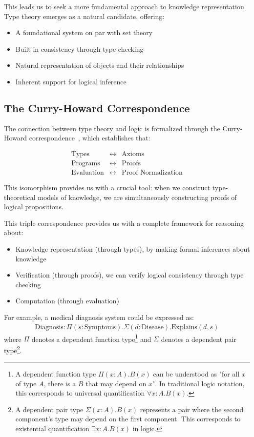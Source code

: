 \documentclass[11pt]{article}
\begin{document}
This leads us to seek a more fundamental approach to knowledge representation. Type theory emerges as a natural candidate, offering:

\begin{itemize}
    \item A foundational system on par with set theory
    \item Built-in consistency through type checking
    \item Natural representation of objects and their relationships
    \item Inherent support for logical inference
\end{itemize}

\subsection{The Curry-Howard Correspondence}
The connection between type theory and logic is formalized through the Curry-Howard correspondence~\cite{mimram2020program}, which establishes that:

\[
\begin{array}{lcl}
\text{Types} & \leftrightarrow & \text{Axioms} \\
\text{Programs} & \leftrightarrow & \text{Proofs} \\
\text{Evaluation} & \leftrightarrow & \text{Proof Normalization}
\end{array}
\]

This isomorphism provides us with a crucial tool: when we construct type-theoretical models of knowledge, we are simultaneously constructing proofs of logical propositions.

This triple correspondence provides us with a complete framework for reasoning about:
\begin{itemize}
    \item Knowledge representation (through types), by making formal inferences about knowledge
    \item Verification (through proofs), we can verify logical consistency through type checking
    \item Computation (through evaluation)
\end{itemize}

For example, a medical diagnosis system could be expressed as:
\[
\begin{array}{l}
\text{Diagnosis} : \Pi(s : \text{Symptoms}).\Sigma(d : \text{Disease}).\text{Explains}(d, s)
\end{array}
\]
where $\Pi$ denotes a dependent function type\footnote{A dependent function type $\Pi(x:A).B(x)$ can be understood as "for all $x$ of type $A$, there is a $B$ that may depend on $x$". In traditional logic notation, this corresponds to universal quantification $\forall x:A.B(x)$.} and $\Sigma$ denotes a dependent pair type\footnote{A dependent pair type $\Sigma(x:A).B(x)$ represents a pair where the second component's type may depend on the first component. This corresponds to existential quantification $\exists x:A.B(x)$ in logic.}.
\end{document}
